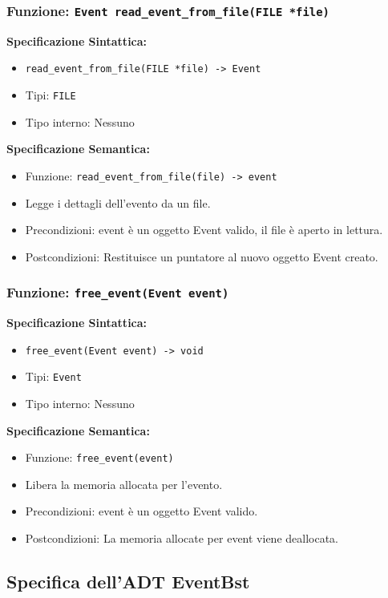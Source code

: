 \documentclass[11pt]{scrartcl} %
\begin{document}
\subsubsection{Funzione: \texttt{Event read\_event\_from\_file(FILE *file)}}

\textbf{Specificazione Sintattica:}
\begin{itemize}
\item \texttt{read\_event\_from\_file(FILE *file) -> Event}
\item Tipi: \texttt{FILE}
\item Tipo interno: Nessuno
\end{itemize}

\textbf{Specificazione Semantica:}
\begin{itemize}
\item Funzione: \texttt{read\_event\_from\_file(file) -> event}
\item Legge i dettagli dell'evento da un file.
\item Precondizioni: event è un oggetto Event valido, il file è aperto in lettura.
\item Postcondizioni: Restituisce un puntatore al nuovo oggetto Event creato.
\end{itemize}

\subsubsection{Funzione: \texttt{free\_event(Event event)}}

\textbf{Specificazione Sintattica:}
\begin{itemize}
\item \texttt{free\_event(Event event) -> void}
\item Tipi: \texttt{Event}
\item Tipo interno: Nessuno
\end{itemize}

\textbf{Specificazione Semantica:}
\begin{itemize}
\item Funzione: \texttt{free\_event(event)}
\item Libera la memoria allocata per l'evento.
\item Precondizioni: event è un oggetto Event valido.
\item Postcondizioni: La memoria allocate per event viene deallocata.
\end{itemize}


\subsection{Specifica dell'ADT EventBst}
\end{document}
